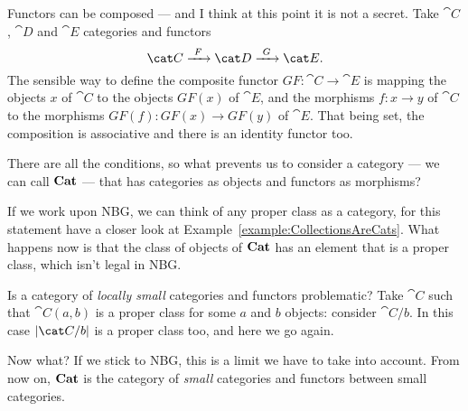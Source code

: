 

Functors can be composed --- and I think at this point it is not a secret. Take \(\cat C\), \(\cat D\) and \(\cat E\) categories and functors
\[\cat C \functo F \cat D \functo G \cat E .\]
The sensible way to define the composite functor \(GF : \cat C \to \cat E\) is mapping the objects \(x\) of \(\cat C\) to the objects \(GF(x)\) of \(\cat E\), and the morphisms \(f : x \to y\) of \(\cat C\) to the morphisms \(GF(f) : GF(x) \to GF(y)\) of \(\cat E\). That being set, the composition is associative and there is an identity functor too.

There are all the conditions, so what prevents us to consider a category --- we can call \(\bf Cat\) --- that has categories as objects and functors as morphisms?

If we work upon NBG, we can think of any proper class as a category, for this statement have a closer look at Example~\ref{example:CollectionsAreCats}. What happens now is that the class of objects of \(\bf Cat\) has an element that is a proper class, which isn't legal in NBG.

Is a category of {\em locally small} categories and functors problematic? Take \(\cat C\) such that \(\cat C(a, b)\) is a proper class for some \(a\) and \(b\) objects: consider \(\cat C{/}{b}\). In this case \(\obj{\cat C/b}\) is a proper class too, and here we go again.

Now what? If we stick to NBG, this is a limit we have to take into account. From now on, \(\bf Cat\) is the category of {\em small} categories and functors between small categories.

